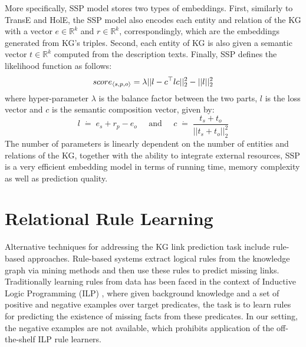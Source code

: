 More specifically, SSP model stores two types of embeddings. First, similarly to TransE and HolE, the SSP model also encodes each entity and relation of the KG with a vector $e \in \mathbb{R}^{k}$ and $r \in \mathbb{R}^{k}$, correspondingly, which are the embeddings generated from KG's triples. Second, each entity of KG is also given a semantic vector $t \in \mathbb{R}^{k}$ computed from the description texts. Finally, SSP defines the likelihood function as follows:
\begin{displaymath}
 score_{\langle s,p,o\rangle} = \lambda||l - c^\top lc||^2_2 - ||l||^2_2
\end{displaymath}
where hyper-parameter $\lambda$ is the balance factor between the two parts, $l$ is the loss vector and $c$ is the semantic composition vector, given by:
\begin{displaymath}
l\;\dot{=}\;e_s + r_p - e_o\;\;\;\;\;\text{and}\;\;\;\;\;c\;\dot{=}\;\frac{t_s + t_o}{||t_s + t_o||_2^2}
\end{displaymath}
The number of parameters is linearly dependent on the number of entities and relations of the KG, together with the ability to integrate external resources, SSP is a very efficient embedding model in terms of running time, memory complexity as well as prediction quality.
\section{Relational Rule Learning}
Alternative techniques for addressing the KG link prediction task include rule-based approaches. Rule-based systems extract logical rules from the knowledge graph via mining methods and then use these rules to predict missing links. Traditionally learning rules from data has been faced in the context of Inductive Logic Programming (ILP) \cite{probfoil,DBLP:conf/ijcai/RaedtDTBV15,DBLP:conf/clima/CorapiSIR11}, where given background knowledge and a set of positive and negative examples over target predicates, the task is to learn rules for predicting the existence of missing facts from these predicates. 
In our setting, the negative examples are not available, which prohibits application of the off-the-shelf ILP rule learners. 

